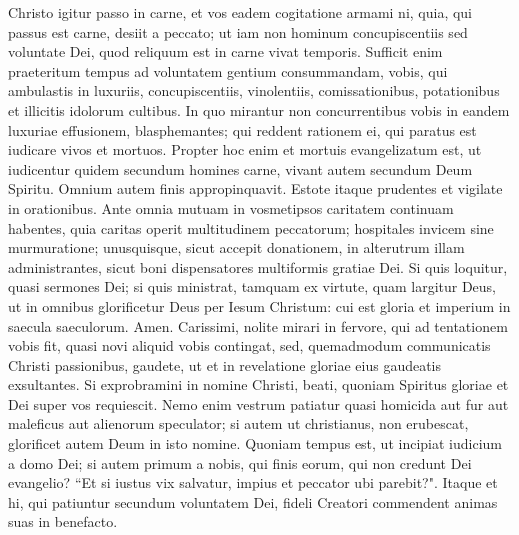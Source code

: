\begin{biblechapter}  
\verse Christo igitur passo in carne, et vos eadem cogitatione armami ni, quia, qui passus est carne, desiit a peccato; 
\verse ut iam non hominum concupiscentiis sed voluntate Dei, quod reliquum est in carne vivat temporis. 
\verse Sufficit enim praeteritum tempus ad voluntatem gentium consummandam, vobis, qui ambulastis in luxuriis, concupiscentiis, vinolentiis, comissationibus, potationibus et illicitis idolorum cultibus. 
\verse In quo mirantur non concurrentibus vobis in eandem luxuriae effusionem, blasphemantes; 
\verse qui reddent rationem ei, qui paratus est iudicare vivos et mortuos. 
\verse Propter hoc enim et mortuis evangelizatum est, ut iudicentur quidem secundum homines carne, vivant autem secundum Deum Spiritu. 
\verse Omnium autem finis appropinquavit. Estote itaque prudentes et vigilate in orationibus. 
\verse Ante omnia mutuam in vosmetipsos caritatem continuam habentes, quia caritas operit multitudinem peccatorum; 
\verse hospitales invicem sine murmuratione; 
\verse unusquisque, sicut accepit donationem, in alterutrum illam administrantes, sicut boni dispensatores multiformis gratiae Dei. 
\verse Si quis loquitur, quasi sermones Dei; si quis ministrat, tamquam ex virtute, quam largitur Deus, ut in omnibus glorificetur Deus per Iesum Christum: cui est gloria et imperium in saecula saeculorum. Amen. 
\verse Carissimi, nolite mirari in fervore, qui ad tentationem vobis fit, quasi novi aliquid vobis contingat, 
\verse sed, quemadmodum communicatis Christi passionibus, gaudete, ut et in revelatione gloriae eius gaudeatis exsultantes.  
\verse Si exprobramini in nomine Christi, beati, quoniam Spiritus gloriae et Dei super vos requiescit. 
\verse Nemo enim vestrum patiatur quasi homicida aut fur aut maleficus aut alienorum speculator; 
\verse si autem ut christianus, non erubescat, glorificet autem Deum in isto nomine. 
\verse Quoniam tempus est, ut incipiat iudicium a domo Dei; si autem primum a nobis, qui finis eorum, qui non credunt Dei evangelio? 
\verse “Et si iustus vix salvatur, impius et peccator ubi parebit?". 
\verse Itaque et hi, qui patiuntur secundum voluntatem Dei, fideli Creatori commendent animas suas in benefacto. 
\end{biblechapter}

